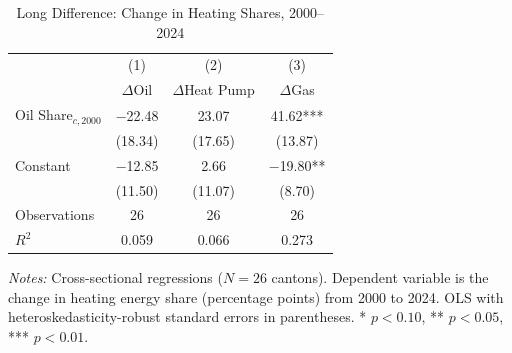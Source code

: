 \begin{table}[H]
\centering
\caption{Long Difference: Change in Heating Shares, 2000--2024}
\label{tab:longdiff}
\begin{threeparttable}
\begin{tabular}{lccc}
\toprule
& (1) & (2) & (3) \\
& $\Delta$Oil & $\Delta$Heat Pump & $\Delta$Gas \\
\midrule
Oil Share$_{c,2000}$ & $-$22.48 & 23.07 & 41.62*** \\
& (18.34) & (17.65) & (13.87) \\
[0.3em]
Constant & $-$12.85 & 2.66 & $-$19.80** \\
& (11.50) & (11.07) & (8.70) \\
[0.5em]
Observations & 26 & 26 & 26 \\
$R^2$ & 0.059 & 0.066 & 0.273 \\
\bottomrule
\end{tabular}
\begin{tablenotes}[flushleft]
\small
\item \textit{Notes:} Cross-sectional regressions ($N=26$ cantons). Dependent variable is the change in heating energy share (percentage points) from 2000 to 2024. OLS with heteroskedasticity-robust standard errors in parentheses. * $p<0.10$, ** $p<0.05$, *** $p<0.01$.
\end{tablenotes}
\end{threeparttable}
\end{table}
